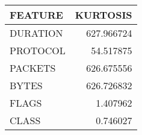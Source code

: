 \begin{tabular}{lr}
\toprule
 FEATURE &   KURTOSIS \\
\midrule
DURATION & 627.966724 \\
PROTOCOL &  54.517875 \\
 PACKETS & 626.675556 \\
   BYTES & 626.726832 \\
   FLAGS &   1.407962 \\
   CLASS &   0.746027 \\
\bottomrule
\end{tabular}
